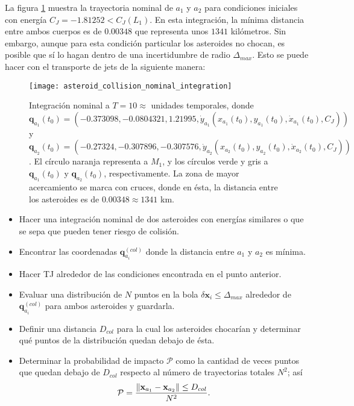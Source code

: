 La figura \ref{fig:asteroid_collision_nominal_integration} muestra la trayectoria nominal de $a_1$ y $a_2$ para condiciones iniciales con energía $C_J = -1.81252 < C_J(L_1)$. En esta integración, la mínima distancia entre ambos cuerpos es de $0.00348$ que representa unos $1341$ kilómetros. Sin embargo, aunque para esta condición particular los asteroides no chocan, es posible que sí lo hagan dentro de una incertidumbre de radio $\Delta_{max}$. Esto se puede hacer con el transporte de jets de la siguiente manera: 

\begin{figure}
 \centering
 \texttt{[image: asteroid\_collision\_nominal\_integration]}
 \caption{Integración nominal a $T=10 \approx $ unidades temporales, donde $\mathbf{q}_{a_1}(t_0) = \left( -0.373098, -0.0804321, 1.21995, \dot{y}_{a_1} \left( x_{a_1}(t_0), y_{a_1}(t_0), \dot{x}_{a_1}(t_0), C_J \right) \right)$ 
 y $\mathbf{q}_{a_2}(t_0) = \left( -0.27324, -0.307896, -0.307576, \dot{y}_{a_2} \left( x_{a_2}(t_0), y_{a_2}(t_0), \dot{x}_{a_2}(t_0), C_J \right) \right)$. El círculo naranja representa a $M_1$, y los círculos verde y gris a $\mathbf{q}_{a_1}(t_0)$ y $\mathbf{q}_{a_2}(t_0)$, respectivamente. La zona de mayor acercamiento se marca con cruces, donde en ésta, la distancia entre los asteroides es de $0.00348 \approx 1341$ km.}
 \label{fig:asteroid_collision_nominal_integration}
\end{figure}

\begin{itemize}
 \item Hacer una integración nominal de dos asteroides con energías similares o que se sepa que pueden tener riesgo de colisión.
 
 \item Encontrar las coordenadas $\mathbf{q}_{a_i}^{(col)}$ donde la distancia entre $a_1$ y $a_2$ es mínima.
 
 \item Hacer TJ alrededor de las condiciones encontrada en el punto anterior.
 
 \item Evaluar una distribución de $N$ puntos en la bola $\delta\mathbf{x}_i \leq \Delta_{max}$ alrededor de $\mathbf{q}_{a_i}^{(col)}$ para ambos asteroides y guardarla.
 
 \item Definir una distancia $D_{col}$ para la cual los asteroides chocarían y determinar qué puntos de la distribución quedan debajo de ésta.
 
 \item Determinar la probabilidad de impacto $\mathcal{P}$ como la cantidad de veces puntos que quedan debajo de $D_{col}$ respecto al número de trayectorias totales $N^2$; así
 \begin{equation} 
 \mathcal{P} = \frac{\left\lVert\mathbf{x}_{a_1} - \mathbf{x}_{a_2} \right\rVert    \leq D_{col} }{N^2}.
 \end{equation}
\end{itemize}

